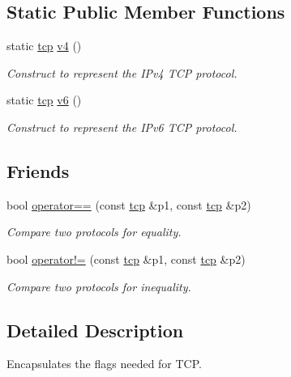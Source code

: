 \subsection*{Static Public Member Functions}
\begin{DoxyCompactItemize}
\item 
static \hyperlink{classasio_1_1ip_1_1tcp}{tcp} \hyperlink{classasio_1_1ip_1_1tcp_a5123c64b44b4c5fd3c016ce75cbf096d}{v4} ()
\begin{DoxyCompactList}\small\item\em Construct to represent the I\+Pv4 T\+C\+P protocol. \end{DoxyCompactList}\item 
static \hyperlink{classasio_1_1ip_1_1tcp}{tcp} \hyperlink{classasio_1_1ip_1_1tcp_ac85324024f1399482b517e05e37f4404}{v6} ()
\begin{DoxyCompactList}\small\item\em Construct to represent the I\+Pv6 T\+C\+P protocol. \end{DoxyCompactList}\end{DoxyCompactItemize}
\subsection*{Friends}
\begin{DoxyCompactItemize}
\item 
bool \hyperlink{classasio_1_1ip_1_1tcp_a234d1b29328e04ab7b47cca4c597aced}{operator==} (const \hyperlink{classasio_1_1ip_1_1tcp}{tcp} \&p1, const \hyperlink{classasio_1_1ip_1_1tcp}{tcp} \&p2)
\begin{DoxyCompactList}\small\item\em Compare two protocols for equality. \end{DoxyCompactList}\item 
bool \hyperlink{classasio_1_1ip_1_1tcp_a77ddd41600cc857e90f01a6aa0413519}{operator!=} (const \hyperlink{classasio_1_1ip_1_1tcp}{tcp} \&p1, const \hyperlink{classasio_1_1ip_1_1tcp}{tcp} \&p2)
\begin{DoxyCompactList}\small\item\em Compare two protocols for inequality. \end{DoxyCompactList}\end{DoxyCompactItemize}


\subsection{Detailed Description}
Encapsulates the flags needed for T\+C\+P. 


